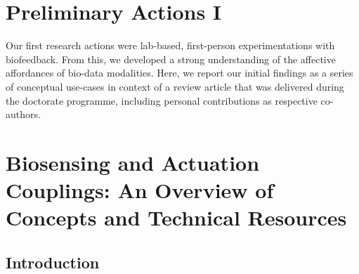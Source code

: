 \section{Preliminary Actions I}
\label{cha:Preliminary_Actions_sens_act}

Our first research actions were lab-based, first-person experimentations  with biofeedback. From this, we developed a strong understanding of the affective affordances of bio-data modalities. Here, we report our initial findings as a series of conceptual use-cases in context of a review article that was delivered during the doctorate programme, including personal contributions as respective co-authors.



\section{Biosensing and Actuation Couplings: An Overview of Concepts and Technical Resources}

\subsection{Introduction}

